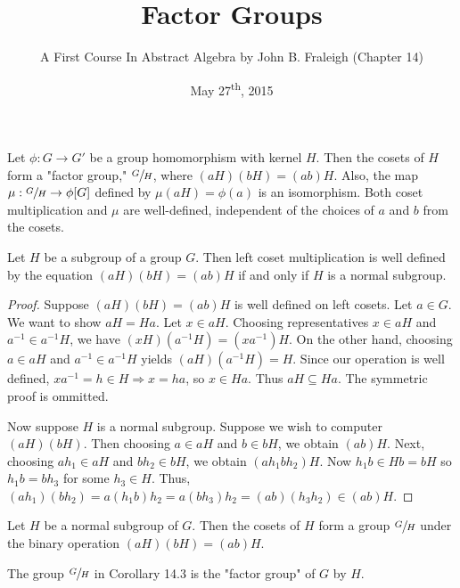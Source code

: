 \documentclass[a4paper,11pt]{article}
\title{Factor Groups}
\author{A First Course In Abstract Algebra by John B. Fraleigh (Chapter 14)}
\date{May 27\textsuperscript{th}, 2015}
\begin{document}
\maketitle
{}

\begin{outline}

    Let \(\phi: G \rightarrow G'\) be a group homomorphism with kernel \(H\). Then the cosets of \(H\) form a 
    "factor group," \(\sfrac{G}{H}\), where \((aH)(bH) = (ab)H\). Also, the map \(\mu: \sfrac{G}{H} \rightarrow
    \phi[G]\) defined by \(\mu(aH) = \phi(a)\) is an isomorphism. Both coset multiplication and \(\mu\) are 
    well-defined, independent of the choices of \(a\) and \(b\) from the cosets.
    
    Let \(H\) be a subgroup of a group \(G\). Then left coset multiplication is well defined by the
    equation \((aH)(bH) = (ab)H\) if and only if \(H\) is a normal subgroup.
    
    \begin{proof}
      \forward
        Suppose \((aH)(bH) = (ab)H\) is well defined on left cosets. Let \(a \in G\). We want to show
        \(aH = Ha\). Let \(x \in aH\). Choosing representatives \(x \in aH\) and \(a^{-1} \in a^{-1}H\), we 
        have \((xH)(a^{-1}H) = (xa^{-1})H\). On the other hand, choosing \(a \in aH\) and \(a^{-1} \in 
        a^{-1}H\) yields \((aH)(a^{-1}H) = H\). Since our operation is well defined, \(xa^{-1} = h \in H 
        \Rightarrow x = ha\), so \(x \in Ha\). Thus \(aH \subseteq Ha\). The symmetric proof is ommitted.
        
      \backward
        Now suppose \(H\) is a normal subgroup. Suppose we wish to computer \((aH)(bH)\). Then choosing
        \(a \in aH\) and \(b \in bH\), we obtain \((ab)H\). Next, choosing \(ah_{1} \in aH\) and \(bh_{2} 
        \in bH\), we obtain \((ah_{1}bh_{2})H\). Now \(h_{1}b \in Hb = bH\) so \(h_{1}b = bh_{3}\) for 
        some \(h_{3} \in H\). Thus, \((ah_{1})(bh_{2}) = a(h_{1}b)h_{2} = a(bh_{3})h_{2} = (ab)(h_{3}h_{2}) 
        \in (ab)H\).
    \end{proof}
    
    Let \(H\) be a normal subgroup of \(G\). Then the cosets of \(H\) form a group \(\sfrac{G}{H}\)
    under the binary operation \((aH)(bH) = (ab)H\).
    
    The group \(\sfrac{G}{H}\) in Corollary 14.3 is the "factor group" of \(G\) by \(H\).
    

\end{outline}
\end{document}
